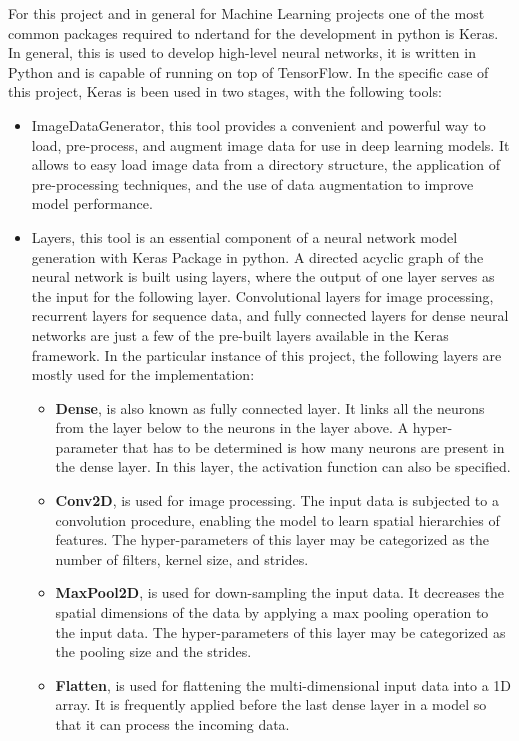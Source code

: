 For this project and in general for Machine Learning projects one of the most common packages required to ndertand for the development in python is Keras. In general, this is used to develop high-level neural networks, it is written in Python and is capable of running on top of TensorFlow. In the specific case of this project, Keras is been used in two stages, with the following tools: 
\begin{itemize}
	\item ImageDataGenerator, this tool provides a convenient and powerful way to load, pre-process, and augment image data for use in deep learning models. It allows to easy load image data from a directory structure, the application of pre-processing techniques, and the use of data augmentation to improve model performance.
	\item Layers, this tool is an essential component of a neural network model generation with Keras Package in python. A directed acyclic graph of the neural network is built using layers, where the output of one layer serves as the input for the following layer. Convolutional layers for image processing, recurrent layers for sequence data, and fully connected layers for dense neural networks are just a few of the pre-built layers available in the Keras framework. In the particular instance of this project, the following layers are mostly used for the implementation: 
	\begin{itemize}
		\item \textbf{Dense}, is also known as fully connected layer.  It links all the neurons from the layer below to the neurons in the layer above. A hyper-parameter that has to be determined is how many neurons are present in the dense layer. In this layer, the activation function can also be specified.
		\item \textbf{Conv2D}, is used for image processing. The input data is subjected to a convolution procedure, enabling the model to learn spatial hierarchies of features. The hyper-parameters of this layer may be categorized as the number of filters, kernel size, and strides.
		\item \textbf{MaxPool2D}, is used for down-sampling the input data. It decreases the spatial dimensions of the data by applying a max pooling operation to the input data. The hyper-parameters of this layer may be categorized as the pooling size and the strides.
		\item  \textbf{Flatten},  is used for flattening the multi-dimensional input data into a 1D array. It is frequently applied before the last dense layer in a model so that it can process the incoming data.
	\end{itemize}
\end{itemize}

